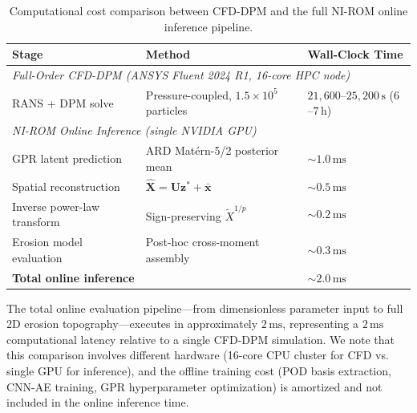 \documentclass{article}
\begin{document}
\begin{table}[htbp]
\centering
\caption{Computational cost comparison between CFD-DPM and the full NI-ROM online inference pipeline.}
\label{tab:timing_breakdown}
\small
\begin{tabular}{lll}
\toprule
\textbf{Stage} & \textbf{Method} & \textbf{Wall-Clock Time} \\
\midrule
\multicolumn{3}{l}{\textit{Full-Order CFD-DPM (ANSYS Fluent 2024 R1, 16-core HPC node)}} \\
\midrule
RANS + DPM solve & Pressure-coupled, $1.5\times10^5$ particles & $21{,}600$--$25{,}200\,\mathrm{s}$ ($6$--$7\,\mathrm{h}$) \\
\midrule
\multicolumn{3}{l}{\textit{NI-ROM Online Inference (single NVIDIA GPU)}} \\
\midrule
GPR latent prediction & ARD Mat\'ern-5/2 posterior mean & $\sim 1.0\,\mathrm{ms}$ \\
Spatial reconstruction & $\hat{\mathbf{X}} = \mathbf{U}\mathbf{z}^* + \bar{\mathbf{x}}$ & $\sim 0.5\,\mathrm{ms}$ \\
Inverse power-law transform & Sign-preserving $\tilde{X}^{1/p}$ & $\sim 0.2\,\mathrm{ms}$ \\
Erosion model evaluation & Post-hoc cross-moment assembly & $\sim 0.3\,\mathrm{ms}$ \\
\midrule
\textbf{Total online inference} & & $\sim 2.0\,\mathrm{ms}$ \\
\bottomrule
\end{tabular}
\end{table}

The total online evaluation pipeline---from dimensionless parameter input to full 2D erosion topography---executes in approximately $2\,\mathrm{ms}$, representing a $2\,\mathrm{ms}$ computational latency relative to a single CFD-DPM simulation. We note that this comparison involves different hardware (16-core CPU cluster for CFD vs. single GPU for inference), and the offline training cost (POD basis extraction, CNN-AE training, GPR hyperparameter optimization) is amortized and not included in the online inference time.
\end{document}
